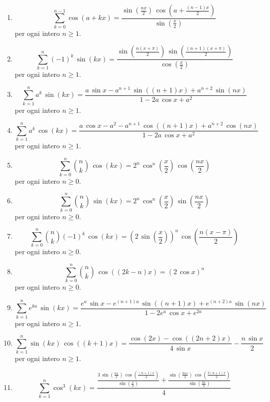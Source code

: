 \documentclass[11pt,a4paper]{article}
\begin{document}
\begin{enumerate}
{\small per ogni intero $n\ge 1$.}
\item \[ \sum_{k=0}^{n - 1} \cos\left(a + k x\right) = \frac{\sin\left(\frac{n x}{2}\right)\,\cos\left(a + \frac{\left(n - 1\right)x}{2}\right)}{\sin\left(\frac{x}{2}\right)} \]
{\small per ogni intero $n\ge 1$.}
\item \[ \sum_{k=1}^{n} \left(-1\right)^{k}\,\sin\left(k x\right) = \frac{\sin\left(\frac{n\left(x + \pi\right)}{2}\right)\,\sin\left(\frac{\left(n + 1\right)\left(x + \pi\right)}{2}\right)}{\cos\left(\frac{x}{2}\right)} \]
{\small per ogni intero $n\ge 1$.}
\item \[ \sum_{k=1}^{n} a^{k}\,\sin\left(k x\right) = \frac{a\,\sin x - a^{n + 1}\,\sin\left(\left(n + 1\right)x\right) + a^{n + 2}\,\sin\left(n x\right)}{1 - 2a\,\cos x + a^{2}} \]
{\small per ogni intero $n\ge 1$.}
\item \[ \sum_{k=1}^{n} a^{k}\,\cos\left(k x\right) = \frac{a\,\cos x - a^{2} - a^{n + 1}\,\cos\left(\left(n + 1\right)x\right) + a^{n + 2}\,\cos\left(n x\right)}{1 - 2a\,\cos x + a^{2}} \]
{\small per ogni intero $n\ge 1$.}
\item \[ \sum_{k=0}^{n} \binom{n}{k}\,\cos\left(k x\right) = 2^{n}\,\cos^{n}\left(\frac{x}{2}\right)\,\cos\left(\frac{n x}{2}\right) \]
{\small per ogni intero $n\ge 0$.}
\item \[ \sum_{k=0}^{n} \binom{n}{k}\,\sin\left(k x\right) = 2^{n}\,\cos^{n}\left(\frac{x}{2}\right)\,\sin\left(\frac{n x}{2}\right) \]
{\small per ogni intero $n\ge 0$.}
\item \[ \sum_{k=0}^{n} \binom{n}{k}\left(-1\right)^{k}\,\cos\left(k x\right) = \left(2\,\sin\left(\frac{x}{2}\right)\right)^{n}\,\cos\left(\frac{n\left(x - \pi\right)}{2}\right) \]
{\small per ogni intero $n\ge 0$.}
\item \[ \sum_{k=0}^{n} \binom{n}{k}\,\cos\left(\left(2k - n\right)x\right) = \left(2\,\cos x\right)^{n} \]
{\small per ogni intero $n\ge 0$.}
\item \[ \sum_{k=1}^{n} e^{k a}\,\sin\left(k x\right) = \frac{e^{a}\,\sin x - e^{\left(n + 1\right)a}\,\sin\left(\left(n + 1\right)x\right) + e^{\left(n + 2\right)a}\,\sin\left(n x\right)}{1 - 2e^{a}\,\cos x + e^{2a}} \]
{\small per ogni intero $n\ge 1$.}
\item \[ \sum_{k=1}^{n} \sin\left(k x\right)\,\cos\left(\left(k + 1\right)x\right) = \frac{\cos\left(2x\right) - \cos\left(\left(2n + 2\right)x\right)}{4\,\sin x} - \frac{n\,\sin x}{2} \]
{\small per ogni intero $n\ge 1$.}
\item \[ \sum_{k=1}^{n} \cos^{3}\left(k x\right) = \frac{\frac{3\,\sin\left(\frac{n x}{2}\right)\,\cos\left(\frac{\left(n + 1\right)x}{2}\right)}{\sin\left(\frac{x}{2}\right)} + \frac{\sin\left(\frac{3n x}{2}\right)\,\cos\left(\frac{3\left(n + 1\right)x}{2}\right)}{\sin\left(\frac{3x}{2}\right)}}{4} \]

\end{enumerate}
\end{document}
